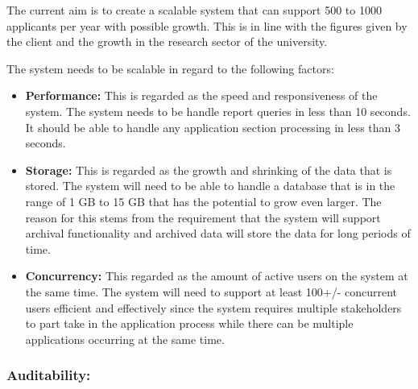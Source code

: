 \begin{flushleft}

The current aim is to create a scalable system that can support 500 to 1000 applicants per year with possible growth. This is in line with the figures given by the client and the growth in the research sector of the university.\\
\vspace{0.05in}

The system needs to be scalable in regard to the following factors:
\begin{itemize}


\item\textbf{Performance:} This is regarded as the speed and responsiveness of the system.
The system needs to be handle report queries in less than 10 seconds. It should be able to handle any application section processing in less than 3 seconds.\\

\item\textbf{Storage:} This is regarded as the growth and shrinking of the data that is stored.
The system will need to be able to handle a database that is in the range of 1 GB to 15 GB that has the potential to grow even larger. The reason for this stems from the requirement that the system will support archival functionality and archived data will store the data for long periods of time.\\

\item\textbf{Concurrency:} This regarded as the amount of active users on the system at the same time.
The system will need to support at least 100+/- concurrent users efficient and effectively since the system requires multiple stakeholders to part take in the application process while there can be multiple applications occurring at the same time.\\

\end{itemize}
\end{flushleft}
\vspace{0.1in}


\subsubsection{Auditability:}

